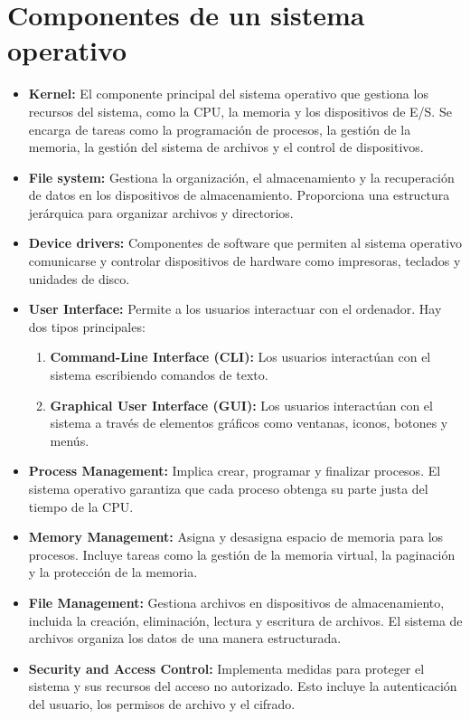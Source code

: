 \documentclass[a4paper]{article} %
\begin{document}
\section{Componentes de un sistema operativo}
\par
\begin{itemize}
    
    \item\textbf{Kernel:} El componente principal del sistema operativo que gestiona los recursos del sistema, como la CPU, la memoria y los dispositivos de E/S. Se encarga de tareas como la programación de procesos, la gestión de la memoria, la gestión del sistema de archivos y el control de dispositivos.
    \item\textbf{File system:} Gestiona la organización, el almacenamiento y la recuperación de datos en los dispositivos de almacenamiento. Proporciona una estructura jerárquica para organizar archivos y directorios.
    \item\textbf{Device drivers:} Componentes de software que permiten al sistema operativo comunicarse y controlar dispositivos de hardware como impresoras, teclados y unidades de disco.
    \item\textbf{User Interface:} Permite a los usuarios interactuar con el ordenador. Hay dos tipos principales:
        \begin{enumerate}
            \item\textbf{Command-Line Interface (CLI):} Los usuarios interactúan con el sistema escribiendo comandos de texto.
            \item\textbf{Graphical User Interface (GUI):} Los usuarios interactúan con el sistema a través de elementos gráficos como ventanas, iconos, botones y menús.
        \end{enumerate}
    \item\textbf{Process Management:} Implica crear, programar y finalizar procesos. El sistema operativo garantiza que cada proceso obtenga su parte justa del tiempo de la CPU.
    \item\textbf{Memory Management:} Asigna y desasigna espacio de memoria para los procesos. Incluye tareas como la gestión de la memoria virtual, la paginación y la protección de la memoria.
    \item\textbf{File Management:} Gestiona archivos en dispositivos de almacenamiento, incluida la creación, eliminación, lectura y escritura de archivos. El sistema de archivos organiza los datos de una manera estructurada.
    \item\textbf{Security and Access Control:} Implementa medidas para proteger el sistema y sus recursos del acceso no autorizado. Esto incluye la autenticación del usuario, los permisos de archivo y el cifrado.

\end{itemize}
\end{document}
